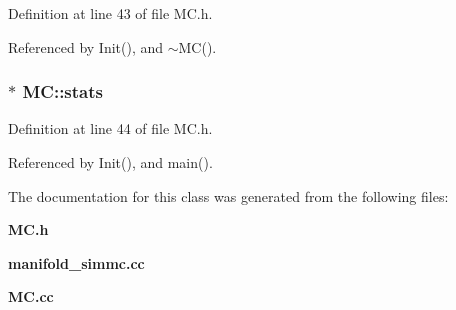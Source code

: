 Definition at line 43 of file MC.h.

Referenced by Init(), and $\sim$MC().
\subsubsection[{stats}]{$\ast$ {\bf MC::stats}}\label{classMC_60c08c4803f1e4117fd6cb8a5b1d5052}




Definition at line 44 of file MC.h.

Referenced by Init(), and main().

The documentation for this class was generated from the following files:\begin{CompactItemize}
\item 
{\bf MC.h}\item 
{\bf manifold\_\-simmc.cc}\item 
{\bf MC.cc}\end{CompactItemize}
